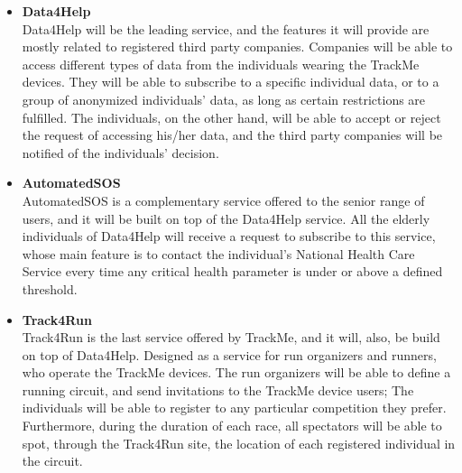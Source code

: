 \documentclass[12pt]{article}
\begin{document}
\begin{itemize}
\item{\textbf{Data4Help}}
\\Data4Help will be the leading service, and the features it will provide are mostly related to registered third party companies. Companies will be able to access different types of data from the individuals wearing the TrackMe devices. They will be able to subscribe to a specific individual data, or to a group of anonymized individuals' data, as long as certain restrictions are fulfilled. The individuals, on the other hand, will be able to accept or reject the request of accessing his/her data, and the third party companies will be notified of the individuals' decision.

\item{\textbf{AutomatedSOS}}
\\ AutomatedSOS is a complementary service offered to the senior range of users, and it will be built on top of the Data4Help service. All the elderly individuals of Data4Help will receive a request to subscribe to this service, whose main feature is to contact the individual's National Health Care Service every time any critical health parameter is under or above a defined threshold. 
\item{\textbf{Track4Run}}
\\Track4Run is the last service offered by TrackMe, and it will, also, be build on top of Data4Help. Designed as a service for run organizers and runners, who operate the TrackMe devices. The run organizers will be able to define a running circuit, and send invitations to the TrackMe device users; The individuals will be able to register to any particular competition they prefer. Furthermore, during the duration of each race, all spectators will be able to spot, through the Track4Run site, the location of each registered individual in the circuit.
\end{itemize}
\end{document}
